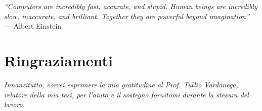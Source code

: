 
\cleardoublepage
{}
{}

\begin{flushright}{
	\slshape    
	``Computers are incredibly fast, accurate, and stupid. Human beings are incredibly slow, inaccurate, and brilliant. Together they are powerful beyond imagination''} \\ 
	\medskip
    --- Albert Einstein
\end{flushright}






\bigskip

\begingroup
\let\clearpage\relax
\let\cleardoublepage\relax
\let\cleardoublepage\relax

\chapter*{Ringraziamenti}

\noindent \textit{Innanzitutto, vorrei esprimere la mia gratitudine al Prof. Tullio Vardanega, relatore della mia tesi, per l'aiuto e il sostegno fornitomi durante la stesura del lavoro.}\\

